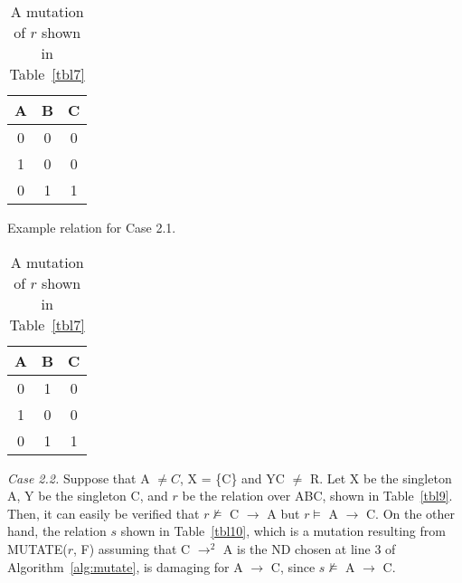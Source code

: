 {\line
\begin{table}[ht]
\begin{minipage}[b]{7cm}
\begin{center}
\begin{tabular}{|c|c|c|} \hline
A & B & C \\ \hline
0 & 0 & 0 \\
1 & 0 & 0 \\ 
0 & 1 & 1 \\ \hline
\end{tabular}
\end{center}
\caption{\label{tbl7} Example relation for Case 2.1.} 
\end{minipage}
\hfill
\begin{minipage}[b]{7cm}
\begin{center}
\begin{tabular}{|c|c|c|} \hline
A & B & C \\ \hline
0 & 1 & 0 \\
1 & 0 & 0 \\ 
0 & 1 & 1 \\ \hline
\end{tabular}
\end{center}
\caption{\label{tbl8} A mutation of $r$ shown in Table~\ref{tbl7}} 
\end{minipage}
\end{table}
}

{\em Case 2.2.}
Suppose that A $\not= C$, X = \{C\} and YC $\not=$ R. 
Let X be the singleton A, Y be the singleton C,
and $r$ be the relation over ABC, shown in Table~\ref{tbl9}.
Then, it can easily be verified that 
$r \not\models$ C $\to$ A but $r \models$ A $\to$ C.
On the other hand, the relation $s$ shown in Table~\ref{tbl10},
which is a mutation resulting from MUTATE($r$, F) assuming that 
C $\to^2$ A is the ND chosen at line 3 of Algorithm~\ref{alg:mutate},
is damaging for A $\to$ C, since $s \not\models$ A $\to$ C.


